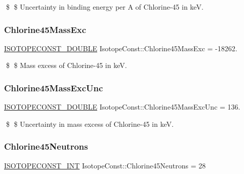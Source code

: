 \$ \$ Uncertainty in binding energy per A of Chlorine-\/45 in keV. \mbox{\label{group___isotope_const-_chlorine-_cl45_ga54a435c8b1ac40d7813046d1e3797733}} 
\subsubsection{\texorpdfstring{Chlorine45\+Mass\+Exc}{Chlorine45MassExc}}
{\footnotesize\ttfamily \mbox{\hyperlink{group___isotope_const-_macros_ga8f45a7272ce02c0b4c65c44636ed719a}{I\+S\+O\+T\+O\+P\+E\+C\+O\+N\+S\+T\+\_\+\+D\+O\+U\+B\+LE}} Isotope\+Const\+::\+Chlorine45\+Mass\+Exc = -\/18262.}

\$ \$ Mass excess of Chlorine-\/45 in keV. \mbox{\label{group___isotope_const-_chlorine-_cl45_gaa41a4dac63f6ad35bb37454a5974aff9}} 
\subsubsection{\texorpdfstring{Chlorine45\+Mass\+Exc\+Unc}{Chlorine45MassExcUnc}}
{\footnotesize\ttfamily \mbox{\hyperlink{group___isotope_const-_macros_ga8f45a7272ce02c0b4c65c44636ed719a}{I\+S\+O\+T\+O\+P\+E\+C\+O\+N\+S\+T\+\_\+\+D\+O\+U\+B\+LE}} Isotope\+Const\+::\+Chlorine45\+Mass\+Exc\+Unc = 136.}

\$ \$ Uncertainty in mass excess of Chlorine-\/45 in keV. \mbox{\label{group___isotope_const-_chlorine-_cl45_ga9233c54a09a5c8be8f9c5c1a2e552da4}} 
\subsubsection{\texorpdfstring{Chlorine45\+Neutrons}{Chlorine45Neutrons}}
{\footnotesize\ttfamily \mbox{\hyperlink{group___isotope_const-_macros_ga5f18360b3e99483a35c32d789e62621c}{I\+S\+O\+T\+O\+P\+E\+C\+O\+N\+S\+T\+\_\+\+I\+NT}} Isotope\+Const\+::\+Chlorine45\+Neutrons = 28}

